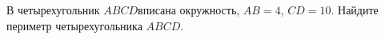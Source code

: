 \begin{ex}
	\begin{condition}
		В четырехугольник \(ABCD\)вписана окружность, \(AB=4\), \(CD=10\). Найдите периметр четырехугольника \(ABCD\).
	\end{condition}
\end{ex}
